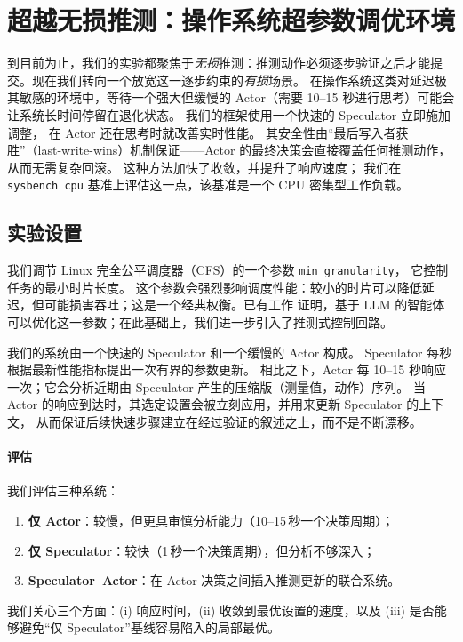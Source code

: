 \section{超越无损推测：操作系统超参数调优环境}
\label{sec:os-speculation}

到目前为止，我们的实验都聚焦于\emph{无损}推测：推测动作必须逐步验证之后才能提交。现在我们转向一个放宽这一逐步约束的\emph{有损}场景。
在操作系统这类对延迟极其敏感的环境中，等待一个强大但缓慢的 Actor（需要 10--15 秒进行思考）可能会让系统长时间停留在退化状态。
我们的框架使用一个快速的 Speculator 立即施加调整，
在 Actor 还在思考时就改善实时性能。
其安全性由“最后写入者获胜”（last-write-wins）机制保证——Actor 的最终决策会直接覆盖任何推测动作，
从而无需复杂回滚。
这种方法加快了收敛，并提升了响应速度；
我们在 \texttt{sysbench cpu} 基准上评估这一点，该基准是一个 CPU 密集型工作负载\citep{sysbench}。

\subsection{实验设置}

我们调节 Linux 完全公平调度器（CFS）的一个参数 \texttt{min\_granularity}，
它控制任务的最小时片长度。
这个参数会强烈影响调度性能：较小的时片可以降低延迟，但可能损害吞吐；这是一个经典权衡。已有工作\citep{liargkovas2025llmTuning} 证明，基于 LLM 的智能体可以优化这一参数；在此基础上，我们进一步引入了推测式控制回路。

我们的系统由一个快速的 Speculator 和一个缓慢的 Actor 构成。
Speculator 每秒根据最新性能指标提出一次有界的参数更新。
相比之下，Actor 每 10--15 秒响应一次；它会分析近期由 Speculator 产生的压缩版（测量值，动作）序列。
当 Actor 的响应到达时，其选定设置会被立刻应用，并用来更新 Speculator 的上下文，
从而保证后续快速步骤建立在经过验证的叙述之上，而不是不断漂移。

\vspace{-3pt}
\paragraph{评估}
我们评估三种系统：
\begin{enumerate}[leftmargin=*]
    \item \textbf{仅 Actor}：较慢，但更具审慎分析能力（10--15\,秒一个决策周期）；
    \item \textbf{仅 Speculator}：较快（1\,秒一个决策周期），但分析不够深入；
    \item \textbf{Speculator--Actor}：在 Actor 决策之间插入推测更新的联合系统。
\end{enumerate}
我们关心三个方面：(i) 响应时间，(ii) 收敛到最优设置的速度，以及 (iii) 是否能够避免“仅 Speculator”基线容易陷入的局部最优。

